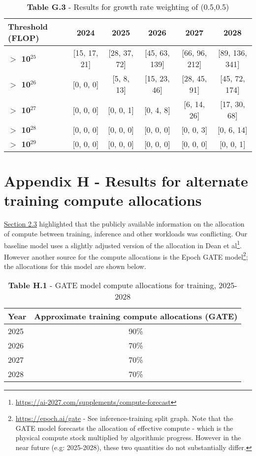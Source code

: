 \documentclass[11pt]{article}
\begin{document}
\begin{table}[h]
\centering
\caption*{\textbf{Table G.3} - Results for growth rate weighting of (0.5,0.5)}
\begin{tabular}{|l|c|c|c|c|c|}
\hline
\textbf{Threshold (FLOP)} & \textbf{2024} & \textbf{2025} & \textbf{2026} & \textbf{2027} & \textbf{2028} \\
\hline
\textbf{$>$ 10$^{25}$} & [15, 17, 21] & [28, 37, 72] & [45, 63, 139] & [66, 96, 212] & [89, 136, 341] \\
\hline
\textbf{$>$ 10$^{26}$} & [0, 0, 0] & [5, 8, 13] & [15, 23, 46] & [28, 45, 91] & [45, 72, 174] \\
\hline
\textbf{$>$ 10$^{27}$} & [0, 0, 0] & [0, 0, 1] & [0, 4, 8] & [6, 14, 26] & [17, 30, 68] \\
\hline
\textbf{$>$ 10$^{28}$} & [0, 0, 0] & [0, 0, 0] & [0, 0, 0] & [0, 0, 3] & [0, 6, 14] \\
\hline
\textbf{$>$ 10$^{29}$} & [0, 0, 0] & [0, 0, 0] & [0, 0, 0] & [0, 0, 0] & [0, 0, 1] \\
\hline
\end{tabular}
\end{table}

\section{Appendix H - Results for alternate training compute allocations}
\label{appendix-h---results-for-alternate-training-compute-allocations}

\hyperref[allocating-compute-between-training-inference-and-other-workloads]{Section 2.3} highlighted that the publicly available information on the allocation of compute between training, inference and other workloads was conflicting. Our baseline model uses a slightly adjusted version of the allocation in Dean et al\footnote{\href{https://ai-2027.com/supplements/compute-forecast}{https://ai-2027.com/supplements/compute-forecast}}. However another source for the compute allocations is the Epoch GATE model\footnote{\href{https://epoch.ai/gate}{https://epoch.ai/gate} - See inference-training split graph. Note that the GATE model forecasts the allocation of effective compute - which is the physical compute stock multiplied by algorithmic progress. However in the near future (e.g: 2025-2028), these two quantities do not substantially differ.}; the allocations for this model are shown below.

\begin{table}[h]
\centering
\caption*{\textbf{Table H.1} - GATE model compute allocations for training, 2025-2028}
\begin{tabular}{|l|c|}
\hline
Year & Approximate training compute allocations (GATE) \\
\hline
2025 & 90\% \\
\hline
2026 & 70\% \\
\hline
2027 & 70\% \\
\hline
2028 & 70\% \\
\hline
\end{tabular}
\end{table}
\end{document}

